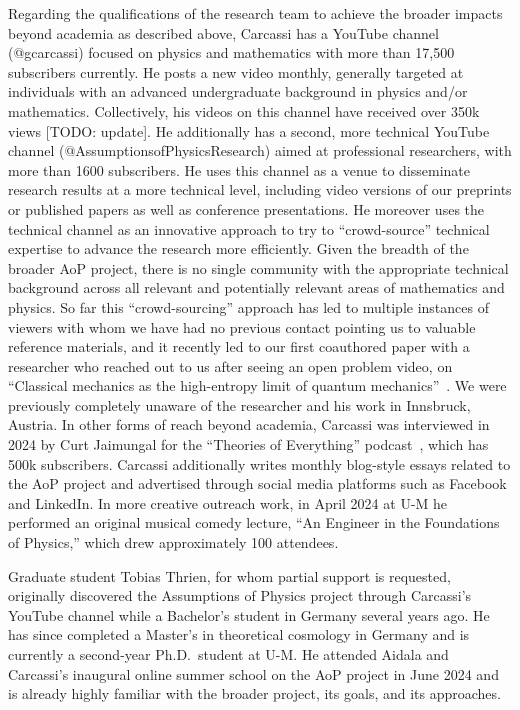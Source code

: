 Regarding the qualifications of the research team to achieve the broader impacts beyond academia as described above, Carcassi has a YouTube channel (@gcarcassi) focused on physics and mathematics with more than 17,500 subscribers currently.  He posts a new video monthly, generally targeted at individuals with an advanced undergraduate background in physics and/or mathematics.  Collectively, his videos on this channel have received over 350k views [TODO: update]. He additionally has a second, more technical YouTube channel (@AssumptionsofPhysicsResearch) aimed at professional researchers, with more than 1600 subscribers.  He uses this channel as a venue to disseminate research results at a more technical level, including video versions of our preprints or published papers as well as conference presentations.  He moreover uses the technical channel as an innovative approach to try to ``crowd-source'' technical expertise to advance the research more efficiently.  Given the breadth of the broader AoP project, there is no single community with the appropriate technical background across all relevant and potentially relevant areas of mathematics and physics.  So far this ``crowd-sourcing'' approach has led to multiple instances of viewers with whom we have had no previous contact pointing us to valuable reference materials, and it recently led to our first coauthored paper with a researcher who reached out to us after seeing an open problem video, on ``Classical mechanics as the high-entropy limit of quantum mechanics''~\cite{aop-classicallimit}. We were previously completely unaware of the researcher and his work in Innsbruck, Austria.  In other forms of reach beyond academia, Carcassi was interviewed in 2024 by Curt Jaimungal for the ``Theories of Everything'' podcast~\cite{Carcassi-ToEInterview}, which has 500k subscribers.  Carcassi additionally writes monthly blog-style essays related to the AoP project and advertised through social media platforms such as Facebook and LinkedIn.  In more creative outreach work, in April 2024 at U-M he performed an original musical comedy lecture, ``An Engineer in the Foundations of Physics,'' which drew approximately 100 attendees. 

Graduate student Tobias Thrien, for whom partial support is requested, originally discovered the Assumptions of Physics project through Carcassi's YouTube channel while a Bachelor's student in Germany several years ago.  He has since completed a Master's in theoretical cosmology in Germany and is currently a second-year Ph.D.~student at U-M.  He attended Aidala and Carcassi's inaugural online summer school on the AoP project in June 2024 and is already highly familiar with the broader project, its goals, and its approaches.  



